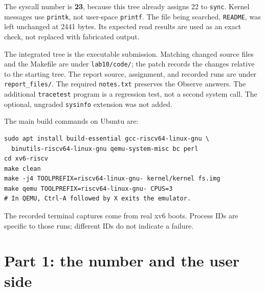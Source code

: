 \documentclass[12pt]{article}
\begin{document}
The syscall number is \textbf{23}, because this tree already assigns 22
to \texttt{sync}. Kernel messages use \texttt{printk}, not user-space
\texttt{printf}. The file being searched, \texttt{README}, was left
unchanged at 2441 bytes. Its expected read results are used as an exact
check, not replaced with fabricated output.

The integrated tree is the executable submission. Matching changed source
files and the Makefile are under \texttt{lab10/code/}; the patch records the
changes relative to the starting tree. The report source, assignment,
and recorded runs are under \texttt{report\_files/}. The required
\texttt{notes.txt} preserves the Observe answers. The additional
\texttt{tracetest} program is a regression test, not a second system call.
The optional, ungraded \texttt{sysinfo} extension was not added.

The main build commands on Ubuntu are:
\begin{lstlisting}
sudo apt install build-essential gcc-riscv64-linux-gnu \
  binutils-riscv64-linux-gnu qemu-system-misc bc perl
cd xv6-riscv
make clean
make -j4 TOOLPREFIX=riscv64-linux-gnu- kernel/kernel fs.img
make qemu TOOLPREFIX=riscv64-linux-gnu- CPUS=3
# In QEMU, Ctrl-A followed by X exits the emulator.
\end{lstlisting}
The recorded terminal captures come from real xv6 boots. Process IDs are
specific to those runs; different IDs do not indicate a failure.

\clearpage
\section{Part 1: the number and the user side}
\end{document}
